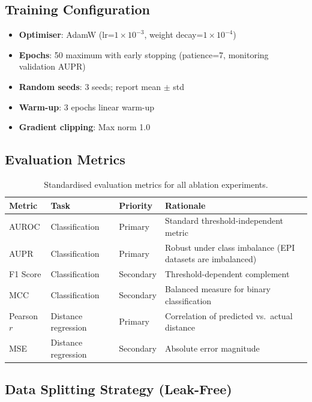 \documentclass[11pt,a4paper]{article}
\begin{document}
\subsection{Training Configuration}

\begin{itemize}
    \item \textbf{Optimiser}: AdamW (lr=$1 \times 10^{-3}$, weight decay=$1 \times 10^{-4}$)
    \item \textbf{Epochs}: 50 maximum with early stopping (patience=7, monitoring validation AUPR)
    \item \textbf{Random seeds}: 3 seeds; report mean $\pm$ std
    \item \textbf{Warm-up}: 3 epochs linear warm-up
    \item \textbf{Gradient clipping}: Max norm 1.0
\end{itemize}

\subsection{Evaluation Metrics}

\begin{table}[H]
\centering
\begin{tabular}{llll}
\toprule
\textbf{Metric} & \textbf{Task} & \textbf{Priority} & \textbf{Rationale} \\
\midrule
AUROC & Classification & Primary & Standard threshold-independent metric \\
AUPR & Classification & Primary & Robust under class imbalance (EPI datasets are imbalanced) \\
F1 Score & Classification & Secondary & Threshold-dependent complement \\
MCC & Classification & Secondary & Balanced measure for binary classification \\
Pearson $r$ & Distance regression & Primary & Correlation of predicted vs.\ actual distance \\
MSE & Distance regression & Secondary & Absolute error magnitude \\
\bottomrule
\end{tabular}
\caption{Standardised evaluation metrics for all ablation experiments.}
\end{table}

\subsection{Data Splitting Strategy (Leak-Free)}
\end{document}
